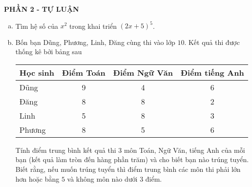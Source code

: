 \begin{center}
	\textbf{PHẦN 2 - TỰ LUẬN}
\end{center}


\begin{bt}%
	\begin{enumerate}[a)]
		\item Tìm hệ số của $x^{2}$ trong khai triển $(2x+5)^{5}$.
		\item Bốn bạn Dũng, Phương, Linh, Đăng cùng thi vào lớp $10$. Kết quả thi được thống kê bởi bảng sau
			\begin{center}
				\begin{tabular}{|l|c|c|c|}
					\hline
					Học sinh & Điểm Toán & Điểm Ngữ Văn & Điểm tiếng Anh\\
					\hline
					Dũng & 9 & 4 & 6\\
					\hline
					Đăng & 8 & 8 & 2\\
					\hline
					Linh & 5 & 8 & 3\\
					\hline
					Phương & 8 & 5 & 6\\
					\hline
				\end{tabular}
			\end{center}
			Tính điểm trung bình kết quả thi $3$ môn Toán, Ngữ Văn, tiếng Anh của mỗi bạn (kết quả làm tròn đến hàng phần trăm) và cho biết bạn nào trúng tuyển. Biết rằng, nếu muốn trúng tuyển thì điểm trung bình các môn thi phải lớn hơn hoặc bằng $5$ và không môn nào dưới $3$ điểm.
	\end{enumerate}
\end{bt}

